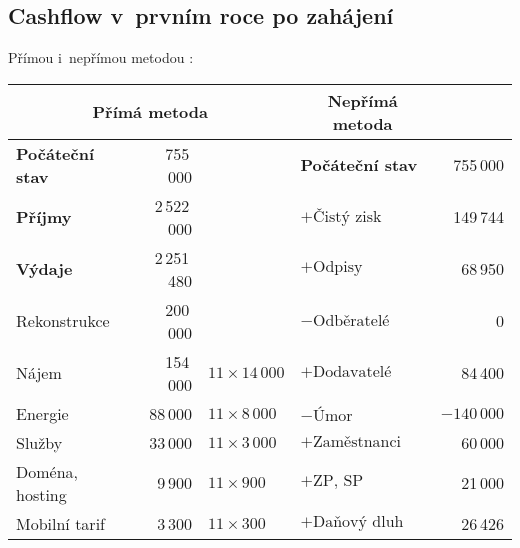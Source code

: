 \newpage

\subsection{Cashflow v~prvním roce po zahájení}
Přímou i~nepřímou metodou \cite{synek_kislingerova}:

\begin{table}[htbp]
\begin{center}
\begin{tabular}{ l r l l r }
\multicolumn{3}{c}{\textbf{Přímá metoda}}                               & \multicolumn{1}{c}{\textbf{Nepřímá metoda}} &                          \\ \hline
\textbf{Počáteční stav}                    & 755\,000            &                   & \textbf{Počáteční stav}                           & 755\,000            \\
\textbf{Příjmy}                            & 2\,522\,000          &                   & $+\text{Čistý zisk}$                              & 149\,744            \\
\textbf{Výdaje}                            & 2\,251\,480          &                   & $+\text{Odpisy}$                                  & 68\,950             \\
\hspace{0,5cm}Rekonstrukce                 & 200\,000            &                   & $-\text{Odběratelé}$                              & 0                  \\
\hspace{0,5cm}Nájem                        & 154\,000            & $11 \times 14\,000$ & $+\text{Dodavatelé}$                              & 84\,400             \\
\hspace{0,5cm}Energie                      & 88\,000             & $11 \times 8\,000$  & $-\text{Úmor}$                                    & $-140\,000$         \\
\hspace{0,5cm}Služby                       & 33\,000             & $11 \times 3\,000$  & $+\text{Zaměstnanci}$                             & 60\,000             \\
\hspace{0,5cm}Doména, hosting              & 9\,900              & $11 \times 900$   & $+\text{ZP, SP}$                                  & 21\,000             \\
\hspace{0,5cm}Mobilní tarif                & 3\,300              & $11 \times 300$   & $+\text{Daňový dluh}$                             & 26\,426             \\

\end{tabular}
\end{center}
\end{table}
